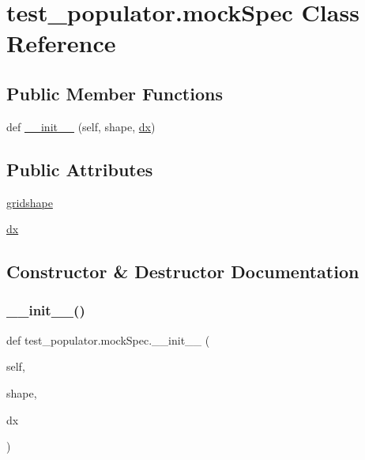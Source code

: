 \hypertarget{classtest__populator_1_1mockSpec}{}\section{test\+\_\+populator.\+mock\+Spec Class Reference}
\label{classtest__populator_1_1mockSpec}
\subsection*{Public Member Functions}
\begin{DoxyCompactItemize}
\item 
def \hyperlink{classtest__populator_1_1mockSpec_aead7a391da0d51340adbd72360922690}{\+\_\+\+\_\+init\+\_\+\+\_\+} (self, shape, \hyperlink{classtest__populator_1_1mockSpec_a19c5edb3d1296b2c8e721c4194a1ae7b}{dx})
\end{DoxyCompactItemize}
\subsection*{Public Attributes}
\begin{DoxyCompactItemize}
\item 
\hyperlink{classtest__populator_1_1mockSpec_abbbcbe3e2934bcd380b0b00ace5e147d}{gridshape}
\item 
\hyperlink{classtest__populator_1_1mockSpec_a19c5edb3d1296b2c8e721c4194a1ae7b}{dx}
\end{DoxyCompactItemize}


\subsection{Constructor \& Destructor Documentation}
\mbox{\label{classtest__populator_1_1mockSpec_aead7a391da0d51340adbd72360922690}} 
\subsubsection{\texorpdfstring{\+\_\+\+\_\+init\+\_\+\+\_\+()}{\_\_init\_\_()}}
{\footnotesize\ttfamily def test\+\_\+populator.\+mock\+Spec.\+\_\+\+\_\+init\+\_\+\+\_\+ (\begin{DoxyParamCaption}\item[{}]{self,  }\item[{}]{shape,  }\item[{}]{dx }\end{DoxyParamCaption})}



